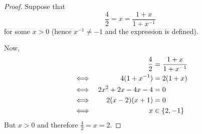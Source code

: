 \documentclass[fleqn,a4paper,11pt]{article}
\begin{document}
\begin{proof}
    Suppose that
    \begin{equation*}
    \frac 42 = x = \frac{1 + x}{1 + x^{-1}}
    \end{equation*}
    for some \(x > 0\) (hence \(x^{-1} \neq -1\) and the expression is defined).

    Now,
    \begin{alignat*}{2}
    &&\frac 42 &= \frac{1 + x}{1 + x^{-1}} \\
    &\iff& 4(1 + x^{-1}) &= 2(1 + x) \\
    &\iff& 2x^2 + 2x - 4x - 4 &= 0 \\
    &\iff& 2(x - 2)(x + 1) &= 0 \\
    &\iff& x &\in \set{2, -1} \\
    \end{alignat*}
    But \(x > 0\) and therefore \(\frac 42 = x = 2\).
\end{proof}

%
%
%
\end{document}
